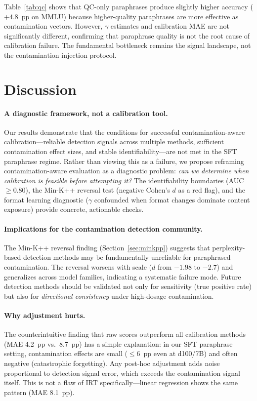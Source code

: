 \documentclass[11pt]{article}
\begin{document}
Table~\ref{tab:qc} shows that QC-only paraphrases produce slightly higher accuracy ($+4.8$~pp on MMLU) because higher-quality paraphrases are more effective as contamination vectors.
However, $\gamma$ estimates and calibration MAE are not significantly different, confirming that paraphrase quality is not the root cause of calibration failure.
The fundamental bottleneck remains the signal landscape, not the contamination injection protocol.


\section{Discussion}

\paragraph{A diagnostic framework, not a calibration tool.}
Our results demonstrate that the conditions for successful contamination-aware calibration---reliable detection signals across multiple methods, sufficient contamination effect sizes, and stable identifiability---are not met in the SFT paraphrase regime.
Rather than viewing this as a failure, we propose reframing contamination-aware evaluation as a diagnostic problem: \emph{can we determine when calibration is feasible before attempting it?}
The identifiability boundaries (AUC~$\geq 0.80$), the Min-K++ reversal test (negative Cohen's $d$ as a red flag), and the format learning diagnostic ($\gamma$ confounded when format changes dominate content exposure) provide concrete, actionable checks.

\paragraph{Implications for the contamination detection community.}
The Min-K++ reversal finding (Section~\ref{sec:minkpp}) suggests that perplexity-based detection methods may be fundamentally unreliable for paraphrased contamination.
The reversal worsens with scale ($d$ from $-1.98$ to $-2.7$) and generalizes across model families, indicating a systematic failure mode.
Future detection methods should be validated not only for sensitivity (true positive rate) but also for \emph{directional consistency} under high-dosage contamination.

\paragraph{Why adjustment hurts.}
The counterintuitive finding that raw scores outperform all calibration methods (MAE 4.2~pp vs.\ 8.7~pp) has a simple explanation: in our SFT paraphrase setting, contamination effects are small ($\leq 6$~pp even at d100/7B) and often negative (catastrophic forgetting).
Any post-hoc adjustment adds noise proportional to detection signal error, which exceeds the contamination signal itself.
This is not a flaw of IRT specifically---linear regression shows the same pattern (MAE 8.1~pp).
\end{document}
